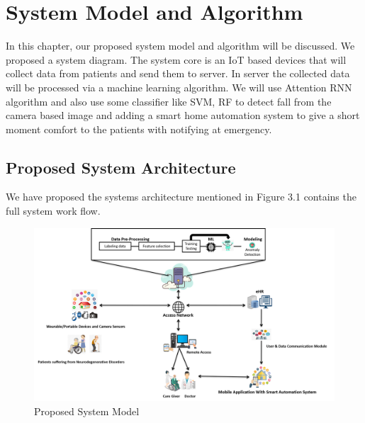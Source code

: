\chapter{System Model and Algorithm}
In this chapter, our proposed system model and algorithm will be discussed. We proposed a system diagram. The system core is an IoT based devices that will collect data from patients and send them to server. In server the collected data will be processed via a machine learning algorithm. We will use Attention RNN algorithm and also use some classifier like SVM, RF to detect fall from the camera based image and adding a smart home automation system to give a short moment comfort to the patients with notifying at emergency.
\section{Proposed System Architecture}


We have proposed the systems architecture mentioned in Figure 3.1 contains the full system work flow.

\begin{figure}[ht]
   \centering
   \includegraphics[width=5.5in]{Chap3/Picture4.png}
   \caption{Proposed System Model}
   \label{fig:model}
\end{figure}

